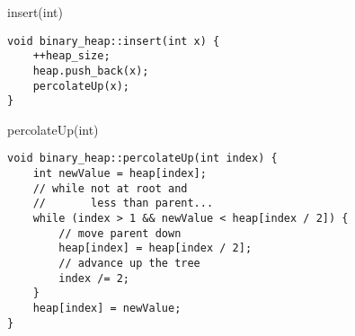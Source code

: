 \begin{frame}[fragile,label=heapInsert]{insert(int)}
\lstset{language=C++,style=small}
\begin{lstlisting}
void binary_heap::insert(int x) {
    ++heap_size;
    heap.push_back(x);
    percolateUp(x);
}
\end{lstlisting}
\end{frame}

\begin{frame}[fragile,label=heapPercuolateUp]{percolateUp(int)}
\lstset{language=C++,style=small}
\begin{lstlisting}
void binary_heap::percolateUp(int index) {
    int newValue = heap[index];
    // while not at root and
    //       less than parent...
    while (index > 1 && newValue < heap[index / 2]) {
        // move parent down
        heap[index] = heap[index / 2];
        // advance up the tree
        index /= 2;
    }
    heap[index] = newValue;
}
\end{lstlisting}
\end{frame}
